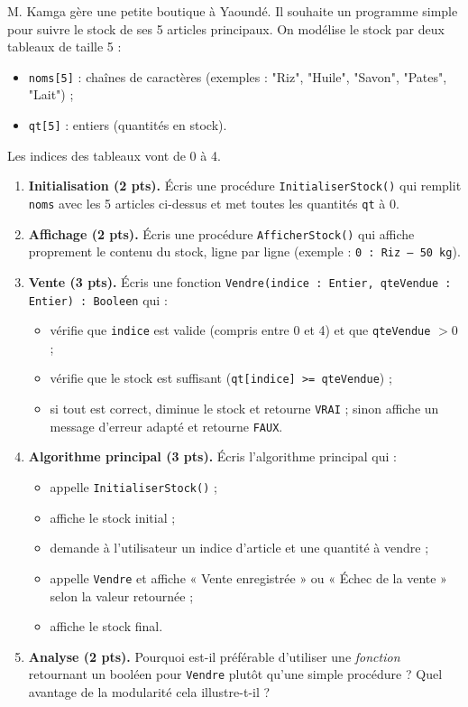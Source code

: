 \documentclass[11pt]{article}
\newcounter{popsec}
\newcounter{popsub}
\newcommand{\courssub}[1]{%
  \stepcounter{popsub}%
  \par\vspace{9pt}\noindent{\popxbold\fontsize{11.5}{13}\selectfont\color{popink}{\color{poporange}\thepopsec.\thepopsub}\hspace{6pt}#1}\par\nopagebreak\vspace{4pt}
}
\begin{document}
\courssub{Je me prépare au BEPC}

\begin{exercice}
M. Kamga gère une petite boutique à Yaoundé. Il souhaite un programme simple pour suivre le stock de ses 5 articles principaux. On modélise le stock par deux tableaux de taille 5 :
\begin{itemize}
    \item \texttt{noms[5]} : chaînes de caractères (exemples : "Riz", "Huile", "Savon", "Pates", "Lait") ;
    \item \texttt{qt[5]} : entiers (quantités en stock).
\end{itemize}
Les indices des tableaux vont de 0 à 4.

\begin{enumerate}
    \item \textbf{Initialisation (2 pts).} Écris une procédure \texttt{InitialiserStock()} qui remplit \texttt{noms} avec les 5 articles ci-dessus et met toutes les quantités \texttt{qt} à 0.
    \item \textbf{Affichage (2 pts).} Écris une procédure \texttt{AfficherStock()} qui affiche proprement le contenu du stock, ligne par ligne (exemple : \texttt{0 : Riz -- 50 kg}).
    \item \textbf{Vente (3 pts).} Écris une fonction \texttt{Vendre(indice : Entier, qteVendue : Entier) : Booleen} qui :
    \begin{itemize}
        \item vérifie que \texttt{indice} est valide (compris entre 0 et 4) et que \texttt{qteVendue} $> 0$ ;
        \item vérifie que le stock est suffisant (\texttt{qt[indice] >= qteVendue}) ;
        \item si tout est correct, diminue le stock et retourne \texttt{VRAI} ; sinon affiche un message d'erreur adapté et retourne \texttt{FAUX}.
    \end{itemize}
    \item \textbf{Algorithme principal (3 pts).} Écris l'algorithme principal qui :
    \begin{itemize}
        \item appelle \texttt{InitialiserStock()} ;
        \item affiche le stock initial ;
        \item demande à l'utilisateur un indice d'article et une quantité à vendre ;
        \item appelle \texttt{Vendre} et affiche « Vente enregistrée » ou « Échec de la vente » selon la valeur retournée ;
        \item affiche le stock final.
    \end{itemize}
    \item \textbf{Analyse (2 pts).} Pourquoi est-il préférable d'utiliser une \emph{fonction} retournant un booléen pour \texttt{Vendre} plutôt qu'une simple procédure ? Quel avantage de la modularité cela illustre-t-il ?
\end{enumerate}
\end{exercice}
\end{document}
